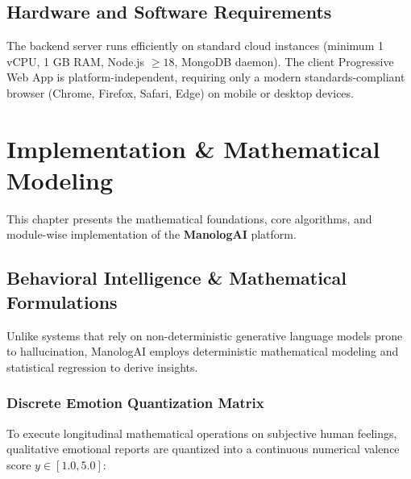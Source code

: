 \section{Hardware and Software Requirements}

The backend server runs efficiently on standard cloud instances (minimum 1 vCPU, 1 GB RAM, Node.js $\ge 18$, MongoDB daemon). The client Progressive Web App is platform-independent, requiring only a modern standards-compliant browser (Chrome, Firefox, Safari, Edge) on mobile or desktop devices.


\chapter{Implementation \& Mathematical Modeling}
\label{Chapter6}

This chapter presents the mathematical foundations, core algorithms, and module-wise implementation of the \textbf{ManologAI} platform.

\section{Behavioral Intelligence \& Mathematical Formulations}

Unlike systems that rely on non-deterministic generative language models prone to hallucination, ManologAI employs deterministic mathematical modeling and statistical regression to derive insights.

\subsection{Discrete Emotion Quantization Matrix}
To execute longitudinal mathematical operations on subjective human feelings, qualitative emotional reports are quantized into a continuous numerical valence score $y \in [1.0, 5.0]$:


